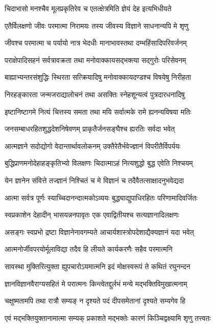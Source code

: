 \twolineshloka
{चिदाभासो मनश्चैव मूलप्रकृतिरेव च}
{एतत्क्षेत्रमिति ज्ञेयं देह इत्यभिधीयते} %

\twolineshloka
{एतैर्विलक्षणो जीवः परमात्मा निरामयः}
{तस्य जीवस्य विज्ञाने साधनान्यपि मे शृणु} %

\twolineshloka
{जीवश्च परमात्मा च पर्यायो नात्र भेदधीः}
{मानाभावस्तथा दम्भहिंसादिपरिवर्जनम्} %

\twolineshloka
{पराक्षेपादिसहनं सर्वत्रावक्रता तथा}
{मनोवाक्कायसद्भक्त्या सद्गुरोः परिसेवनम्} %

\twolineshloka
{बाह्याभ्यन्तरसंशुद्धिः स्थिरता सत्क्रियादिषु}
{मनोवाक्कायदण्डश्च विषयेषु निरीहता} %

\twolineshloka
{निरहङ्कारता जन्मजराद्यालोचनं तथा}
{असक्तिः स्नेहशून्यत्वं पुत्रदारधनादिषु} %

\twolineshloka
{इष्टानिष्टागमे नित्यं चित्तस्य समता तथा}
{मयि सर्वात्मके रामे ह्यनन्यविषया मतिः} %

\twolineshloka
{जनसम्बाधरहितशुद्धदेशनिषेवणम्}
{प्राकृतैर्जनसङ्घैश्च ह्यरतिः सर्वदा भवेत्} %

\twolineshloka
{आत्मज्ञाने सदोद्योगो वेदान्तार्थावलोकनम्}
{उक्तैरेतैर्भवेज्ज्ञानं विपरीतैर्विपर्ययः} %

\twolineshloka
{बुद्धिप्राणमनोदेहाहङ्कृतिभ्यो विलक्षणः}
{चिदात्माऽहं नित्यशुद्धो बुद्ध एवेति निश्चयम्} %

\twolineshloka
{येन ज्ञानेन संवित्ते तज्ज्ञानं निश्चितं च मे}
{विज्ञानं च तदैवैतत्साक्षादनुभवेद्यदा} %

\twolineshloka
{आत्मा सर्वत्र पूर्णः स्याच्चिदानन्दात्मकोऽव्ययः}
{बुद्ध्याद्युपाधिरहितः परिणामादिवर्जितः} %

\twolineshloka
{स्वप्रकाशेन देहादीन् भासयन्ननपावृतः}
{एक एवाद्वितीयश्च सत्यज्ञानादिलक्षणः} %

\twolineshloka
{असङ्गः स्वप्रभो द्रष्टा विज्ञानेनावगम्यते}
{आचार्यशास्त्रोपदेशाद्यैक्यज्ञानं यदा भवेत्} %

\twolineshloka
{आत्मनोर्जीवपरयोर्मूलाविद्या तदैव हि}
{लीयते कार्यकरणैः सहैव परमात्मनि} %

\twolineshloka
{सावस्था मुक्तिरित्युक्ता ह्युपचारोऽयमात्मनि}
{इदं मोक्षस्वरूपं ते कथितं रघुनन्दन} %

\twolineshloka
{ज्ञानविज्ञानवैराग्यसहितं मे परात्मनः}
{किन्त्वेतद्दुर्लभं मन्ये मद्भक्तिविमुखात्मनाम्} %

\twolineshloka
{चक्षुष्मतामपि तथा रात्रौ सम्यङ् न दृश्यते}
{पदं दीपसमेतानां दृश्यते सम्यगेव हि} %

\twolineshloka
{एवं मद्भक्तियुक्तानामात्मा सम्यक् प्रकाशते}
{मद्भक्तेः कारणं किञ्चिद्वक्ष्यामि शृणु तत्त्वतः} %

